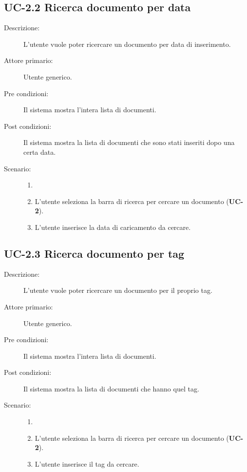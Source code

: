 \subsection{UC-2.2 Ricerca documento per data}
\begin{description}
    \item[Descrizione:] L’utente vuole poter ricercare un documento per data di inserimento.
    \item[Attore primario:] Utente generico.
    \item[Pre condizioni:] Il sistema mostra l’intera lista di documenti.
    \item[Post condizioni:] Il sistema mostra la lista di documenti che sono stati inseriti dopo una certa data.
    \item[Scenario:] 
    \begin{enumerate}
        \item[]
        \item L’utente seleziona la barra di ricerca per cercare un documento (\textbf{UC-2}).
        \item L’utente inserisce la data di caricamento da cercare.
    \end{enumerate}
\end{description}

\subsection{UC-2.3 Ricerca documento per tag}
\begin{description}
    \item[Descrizione:] L’utente vuole poter ricercare un documento per il proprio tag.
    \item[Attore primario:] Utente generico.
    \item[Pre condizioni:] Il sistema mostra l’intera lista di documenti.
    \item[Post condizioni:] Il sistema mostra la lista di documenti che hanno quel tag.
    \item[Scenario:] 
    \begin{enumerate}
        \item[]
        \item L’utente seleziona la barra di ricerca per cercare un documento (\textbf{UC-2}).
        \item L’utente inserisce il tag da cercare.
    \end{enumerate}
\end{description}

